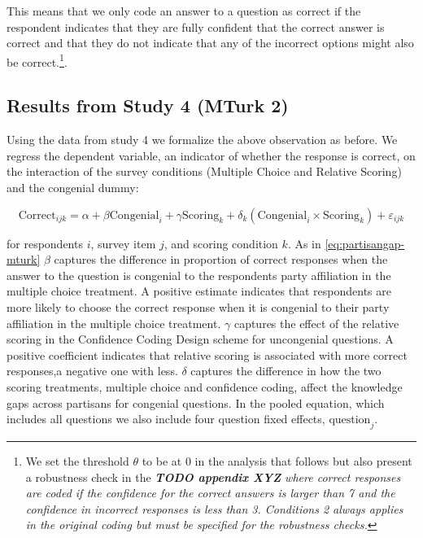 \documentclass[12pt, letterpaper]{article}
\newcommand{\bgcd} {\color{purple}\em }
\newcommand{\ech}{\color{black}\rm  }    %
\begin{document}
	This means that we only code an answer to a question as correct if the respondent indicates that they are fully confident that the correct answer is correct and that they do not indicate that any of the incorrect options might also be correct.\footnote{We set the threshold \(\theta\) to be at 0 in the analysis that follows but also present a robustness check in the \bgcd \textbf{TODO appendix XYZ} \ech where correct responses are coded if the confidence for the correct answers is larger than 7 and the confidence in incorrect responses is less than 3. Conditions 2 always applies in the original coding but must be specified for the robustness checks.}.
	
	\subsection*{Results from Study 4 (MTurk 2)}
	
	Using the data from study 4 we formalize the above observation as before. We regress the dependent variable, an indicator of whether the response is correct, on the interaction of the survey conditions (Multiple Choice and Relative Scoring) and the congenial dummy:
	
	\begin{equation}\label{eq:partisangap-mturk2}
	\text{Correct}_{ijk} = \alpha + \beta \text{Congenial}_i + \gamma \text{Scoring}_k + \delta_k (\text{Congenial}_i \times \text{Scoring}_k) + \varepsilon_{ijk}
	\end{equation}
	
	
	for respondents \(i\), survey item \(j\), and scoring condition \(k\). As in \cref{eq:partisangap-mturk} \(\beta\) captures the difference in proportion of correct responses when the answer to the question is congenial to the respondents party affiliation in the multiple choice treatment. A positive estimate indicates that respondents are more likely to choose the correct response when it is congenial to their party affiliation in the multiple choice treatment. \(\gamma\) captures the effect of the relative scoring in the Confidence Coding Design scheme for uncongenial questions. A positive coefficient indicates that relative scoring is associated with more correct responses,a negative one with less. \(\delta\) captures the difference in how the two scoring treatments, multiple choice and confidence coding, affect the knowledge gaps across partisans for congenial questions. In the pooled equation, which includes all questions we also include four question fixed effects, \(\text{question}_j\).
	
\end{document}

